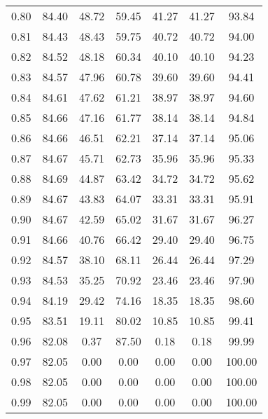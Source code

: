 \begin{tabular}{|c|c|c|c|c|c|c|}
      0.80 &     84.40 &     48.72 &      59.45 &   41.27 &      41.27 &         93.84 \\
      0.81 &     84.43 &     48.43 &      59.75 &   40.72 &      40.72 &         94.00 \\
      0.82 &     84.52 &     48.18 &      60.34 &   40.10 &      40.10 &         94.23 \\
      0.83 &     84.57 &     47.96 &      60.78 &   39.60 &      39.60 &         94.41 \\
      0.84 &     84.61 &     47.62 &      61.21 &   38.97 &      38.97 &         94.60 \\
      0.85 &     84.66 &     47.16 &      61.77 &   38.14 &      38.14 &         94.84 \\
      0.86 &     84.66 &     46.51 &      62.21 &   37.14 &      37.14 &         95.06 \\
      0.87 &     84.67 &     45.71 &      62.73 &   35.96 &      35.96 &         95.33 \\
      0.88 &     84.69 &     44.87 &      63.42 &   34.72 &      34.72 &         95.62 \\
      0.89 &     84.67 &     43.83 &      64.07 &   33.31 &      33.31 &         95.91 \\
      0.90 &     84.67 &     42.59 &      65.02 &   31.67 &      31.67 &         96.27 \\
      0.91 &     84.66 &     40.76 &      66.42 &   29.40 &      29.40 &         96.75 \\
      0.92 &     84.57 &     38.10 &      68.11 &   26.44 &      26.44 &         97.29 \\
      0.93 &     84.53 &     35.25 &      70.92 &   23.46 &      23.46 &         97.90 \\
      0.94 &     84.19 &     29.42 &      74.16 &   18.35 &      18.35 &         98.60 \\
      0.95 &     83.51 &     19.11 &      80.02 &   10.85 &      10.85 &         99.41 \\
      0.96 &     82.08 &      0.37 &      87.50 &    0.18 &       0.18 &         99.99 \\
      0.97 &     82.05 &      0.00 &       0.00 &    0.00 &       0.00 &        100.00 \\
      0.98 &     82.05 &      0.00 &       0.00 &    0.00 &       0.00 &        100.00 \\
      0.99 &     82.05 &      0.00 &       0.00 &    0.00 &       0.00 &        100.00 \\
\bottomrule
\end{tabular}
